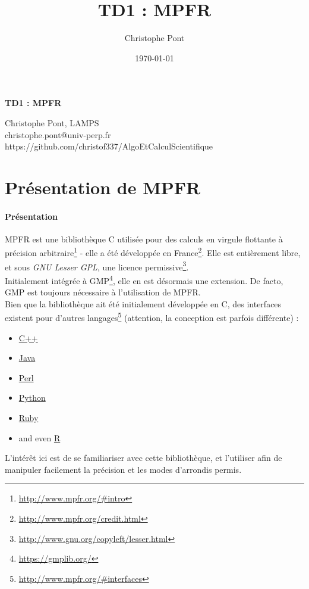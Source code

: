 \documentclass[a4paper,11pt]{exam}
\begin{document}
\title{\large TD1 : MPFR}
\author{Christophe Pont}
\date{\today{}} %

\lstset{language=C} 

\centering
{\huge\bfseries TD1 : MPFR\par}
\begin{flushleft}
{Christophe Pont, LAMPS \\ 
christophe.pont@univ-perp.fr \\ 
https://github.com/christof337/AlgoEtCalculScientifique}
\end{flushleft}

\justifying
\section{Présentation de MPFR}
\paragraph{Présentation}
MPFR est une bibliothèque C utilisée pour des calculs en virgule flottante à précision arbitraire\footnote{\url{http://www.mpfr.org/\#intro}} - elle a été développée en France\footnote{\url{http://www.mpfr.org/credit.html}}. 
Elle est entièrement libre, et sous \emph{GNU Lesser GPL}, une licence permissive\footnote{\url{http://www.gnu.org/copyleft/lesser.html}}.\\
Initialement intégrée à GMP\footnote{\url{https://gmplib.org/}}, elle en est désormais une extension. De facto, GMP est toujours nécessaire à l'utilisation de MPFR. \\
Bien que la bibliothèque ait été initialement développée en C, des interfaces existent pour d'autres langages\footnote{\url{http://www.mpfr.org/\#interfaces}} (attention, la conception est parfois différente) :
	\begin{itemize}
		\item \href{http://www.mpfr.org/\#interfaces}{C++}
		\item \href{https://github.com/kframework/mpfr-java}{Java}
		\item \href{http://search.cpan.org/~sisyphus/Math-MPFR/}{Perl}
		\item \href{https://pypi.python.org/pypi/gmpy2}{Python}
		\item \href{http://rubygems.org/gems/gmp}{Ruby}
		\item and even \href{https://cran.r-project.org/web/packages/Rmpfr/index.html}{R}
	\end{itemize}
L'intérêt ici est de se familiariser avec cette bibliothèque, et l'utiliser afin de manipuler facilement la précision et les modes d'arrondis permis.  
\end{document}
